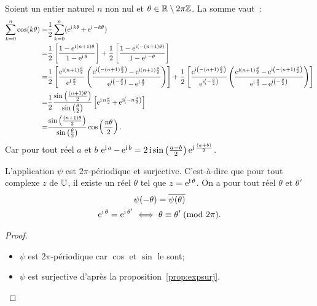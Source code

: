 Soient un entier naturel \(n\) non nul et \(\theta \in \mathbb{R} \setminus 2\pi\mathbb{Z}\). La somme vaut~:
\begin{align*}
    \sum_{k = 0}^n \cos(k\theta)  = & \frac{1}{2} \sum_{k = 0}^n (\operatorname{e}^{\operatorname{i} k \theta} + \operatorname{e}^{\operatorname{i} -k \theta})\\
     = &\frac{1}{2} \left[\frac{1-\operatorname{e}^{\operatorname{i} (n + 1)\theta}}{1-\operatorname{e}^{\operatorname{i} \theta}}\right] 
    + \frac{1}{2} \left[\frac{1-\operatorname{e}^{\operatorname{i} (-(n + 1) 
    \theta)}}{1-\operatorname{e}^{\operatorname{i} -\theta}}\right]\\
     = &\frac{1}{2} \left[\frac{\operatorname{e}^{\operatorname{i} (n + 1) 
    \frac{\theta}{2}}}{\operatorname{e}^{\operatorname{i} \frac{\theta}{2}}} 
    \left(\frac{\operatorname{e}^{\operatorname{i} \left(-(n + 1) \frac{\theta}{2}\right)}-\operatorname{e}^{\operatorname{i} (n + 1) 
    \frac{\theta}{2}}}{\operatorname{e}^{\operatorname{i} \left(-\frac{\theta}{2}\right)} - 
    \operatorname{e}^{\operatorname{i} \frac{\theta}{2}}} \right)\right] \notag + \frac{1}{2} 
    \left[\frac{\operatorname{e}^{\operatorname{i} \left(-(n + 1) 
    \frac{\theta}{2}\right)}}{\operatorname{e}^{\operatorname{i} \left(-\frac{\theta}{2}\right)}} 
    \left(\frac{\operatorname{e}^{\operatorname{i} (n + 1) \frac{\theta}{2}}-\operatorname{e}^{\operatorname{i} \left(-(n + 1) 
    \frac{\theta}{2}\right)}}{\operatorname{e}^{\operatorname{i} \frac{\theta}{2}} - 
    \operatorname{e}^{\operatorname{i} \left(-\frac{\theta}{2}\right)}} \right)\right] \\
     = & \frac{1}{2} \frac{\sin \left(\frac{(n + 1)\theta}{2} \right)}{\sin \left( 
    \frac{\theta}{2} \right)} \left[\operatorname{e}^{\operatorname{i} n \frac{\theta}{2}} 
     + \operatorname{e}^{\operatorname{i} \left(-n \frac{\theta}{2}\right)} \right] \\
     = & \frac{\sin \left(\frac{(n + 1)\theta}{2} \right)}{\sin \left( 
    \frac{\theta}{2} \right)} \cos \left( \frac{n\theta}{2} \right).
\end{align*}
Car pour tout réel \(a\) et \(b\) \(\operatorname{e}^{\operatorname{i} a}-\operatorname{e}^{\operatorname{i} b} = 2\operatorname{i} 
\sin\left(\frac{a-b}{2}\right)\operatorname{e}^{\operatorname{i} \frac{(a + b)}{2}}\).

\begin{prop}
    L'application \(\psi\) est  \(2\pi\)-périodique et surjective. C'est-à-dire 
    que pour tout complexe \(z\) de \(\mathbb{U}\), il existe un réel \(\theta\) tel que 
    \(z = \operatorname{e}^{\operatorname{i} \theta}\). On a pour tout réel \(\theta\) et \(\theta'\)
    \begin{gather}
        \psi(-\theta) = \overline{\psi(\theta)}\\
        \operatorname{e}^{\operatorname{i} \theta} = \operatorname{e}^{\operatorname{i} \theta'} \iff \theta \equiv \theta'\!\pmod {2\pi}.
    \end{gather}
\end{prop}

\begin{proof}
    \begin{itemize}
        \item \(\psi\) est \(2\pi\)-périodique car \(\cos\) et \(\sin\) le sont;
        \item \(\psi\) est surjective d'après la proposition~\ref{prop:expsurj}.
    \end{itemize}
\end{proof}

